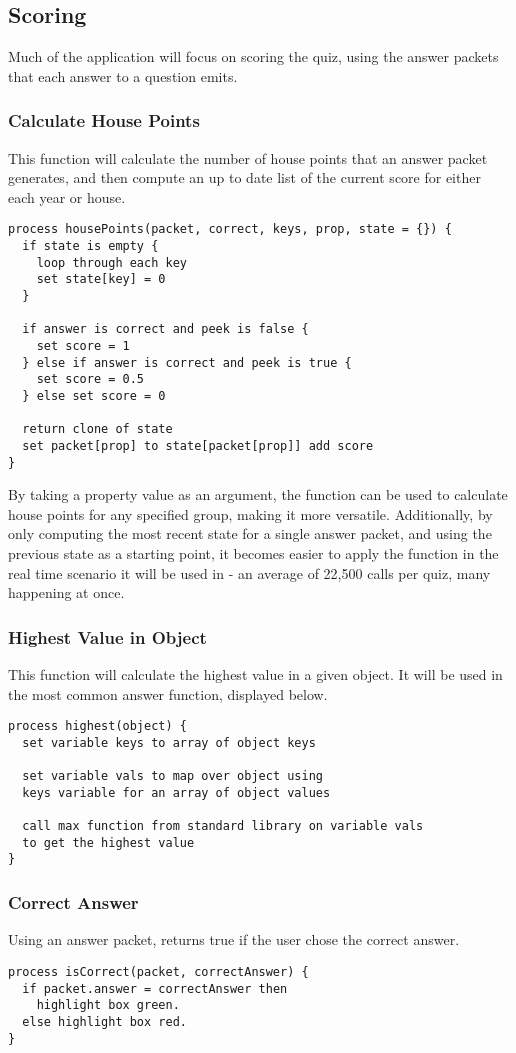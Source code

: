 \subsection{Scoring}
Much of the application will focus on scoring the quiz, using the answer packets that each answer to a question emits.

\subsubsection{Calculate House Points}
This function will calculate the number of house points that an answer packet generates, and then compute an up to date list of the current score for either each year or house.
\begin{verbatim}
process housePoints(packet, correct, keys, prop, state = {}) {
  if state is empty {
    loop through each key
    set state[key] = 0
  }

  if answer is correct and peek is false {
    set score = 1
  } else if answer is correct and peek is true {
    set score = 0.5
  } else set score = 0

  return clone of state
  set packet[prop] to state[packet[prop]] add score
}
\end{verbatim}
By taking a property value as an argument, the function can be used to calculate house points for any specified group, making it more versatile. Additionally, by only computing the most recent state for a single answer packet, and using the previous state as a starting point, it becomes easier to apply the function in the real time scenario it will be used in - an average of 22,500 calls per quiz, many happening at once.

\subsubsection{Highest Value in Object}
This function will calculate the highest value in a given object. It will be used in the most common answer function, displayed below.
\begin{verbatim}
process highest(object) {
  set variable keys to array of object keys

  set variable vals to map over object using
  keys variable for an array of object values

  call max function from standard library on variable vals
  to get the highest value
}
\end{verbatim}

\subsubsection{Correct Answer}
Using an answer packet, returns true if the user chose the correct answer.
\begin{verbatim}
process isCorrect(packet, correctAnswer) {
  if packet.answer = correctAnswer then
    highlight box green.
  else highlight box red.
}
\end{verbatim}

